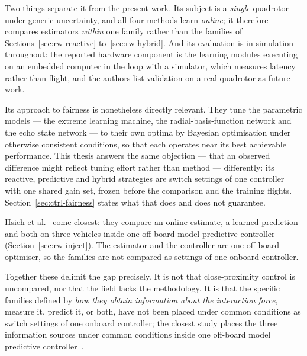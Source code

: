 Two things separate it from the present work. Its subject is a \emph{single} quadrotor under
generic uncertainty, and all four methods learn \emph{online}; it therefore compares estimators
\emph{within} one family rather than the families of Sections~\ref{sec:rw-reactive}
to~\ref{sec:rw-hybrid}. And its evaluation is in simulation throughout: the reported hardware
component is the learning modules executing on an embedded computer in the loop with a simulator,
which measures latency rather than flight, and the authors list validation on a real quadrotor as
future work.

Its approach to fairness is nonetheless directly relevant. They tune the parametric models --- the
extreme learning machine, the radial-basis-function network and the echo state network --- to their
own optima by Bayesian optimisation under otherwise consistent conditions, so that each operates
near its best achievable performance. This thesis answers the same objection --- that an observed
difference might reflect tuning effort rather than method --- differently: its reactive,
predictive and hybrid strategies are switch settings of one controller with one shared gain set,
frozen before the comparison and the training flights. Section~\ref{sec:ctrl-fairness} states what
that does and does not guarantee.

Hsieh et al.~\cite{hsieh2025onlineadaptation} come closest: they compare an online estimate, a learned
prediction and both on three vehicles inside one off-board model predictive controller
(Section~\ref{sec:rw-inject}). The estimator and the controller are one off-board optimiser, so the
families are not compared as settings of one onboard controller.

Together these delimit the gap precisely. It is not that close-proximity control is uncompared, nor
that the field lacks the methodology. It is that the specific families defined by \emph{how they
obtain information about the interaction force}, measure it, predict it, or both, have not been placed under common conditions as switch settings of one onboard controller; the closest study places the three information sources under common conditions inside one off-board model predictive controller~\cite{hsieh2025onlineadaptation}.

